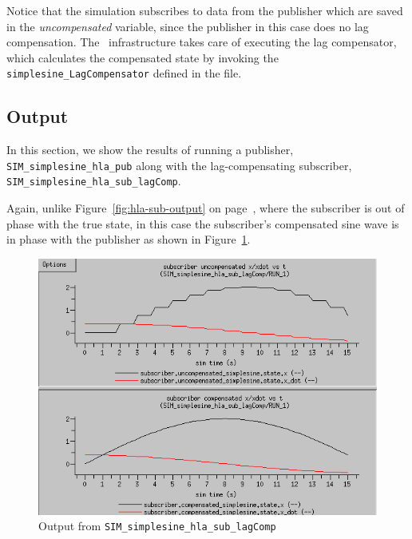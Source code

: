Notice that the simulation subscribes to data from the publisher which are
saved in the {\em uncompensated} \simplesine variable, since the publisher
in this case does no lag compensation.
The \TrickHLA\ infrastructure takes care of executing the lag compensator,
which calculates the compensated \simplesine state by invoking
the {\tt simplesine\_LagCompensator} defined in the \sdefine file.

\subsection{Output}

In this section,
we show the results of running a publisher,
{\tt SIM\_simplesine\_hla\_pub}
along with the lag-compensating
subscriber,
{\tt SIM\_simplesine\_hla\_sub\_lagComp}.

Again,
unlike Figure~\ref{fig:hla-sub-output} on page~\pageref{fig:hla-sub-output},
where the subscriber is out of phase with the true state,
in this case the subscriber's compensated sine wave is
in phase with the publisher
as shown in Figure~\ref{fig:hla-sub-lagComp-output}.

\begin{figure}[b]
  \begin{center}
    \includegraphics[width=4.5in]{TrickHLAUser-SIM-hla-sub-lagComp.png}
  \end{center}
\caption{Output from {\tt SIM\_simplesine\_hla\_sub\_lagComp}}
\label{fig:hla-sub-lagComp-output}
\end{figure}

\clearpage
